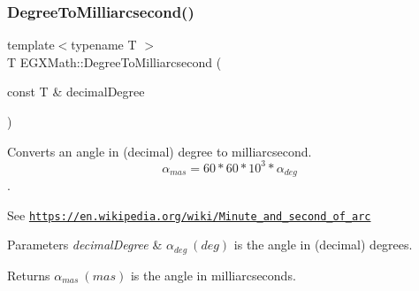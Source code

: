 \subsubsection{\texorpdfstring{Degree\+To\+Milliarcsecond()}{DegreeToMilliarcsecond()}}
{\footnotesize\ttfamily template$<$typename T $>$ \\
T E\+G\+X\+Math\+::\+Degree\+To\+Milliarcsecond (\begin{DoxyParamCaption}\item[{const T \&}]{decimal\+Degree }\end{DoxyParamCaption})}



Converts an angle in (decimal) degree to milliarcsecond. \[\alpha_{mas}=60 * 60 * 10^3 * \alpha_{deg} \]. 

See \href{https://en.wikipedia.org/wiki/Minute_and_second_of_arc}{\tt https\+://en.\+wikipedia.\+org/wiki/\+Minute\+\_\+and\+\_\+second\+\_\+of\+\_\+arc} 
\begin{DoxyParams}{Parameters}
{\em decimal\+Degree} & $\alpha_{deg}\ (deg)$ is the angle in (decimal) degrees. \\
\hline
\end{DoxyParams}
\begin{DoxyReturn}{Returns}
$\alpha_{mas}\ (mas)$ is the angle in milliarcseconds. 
\end{DoxyReturn}

